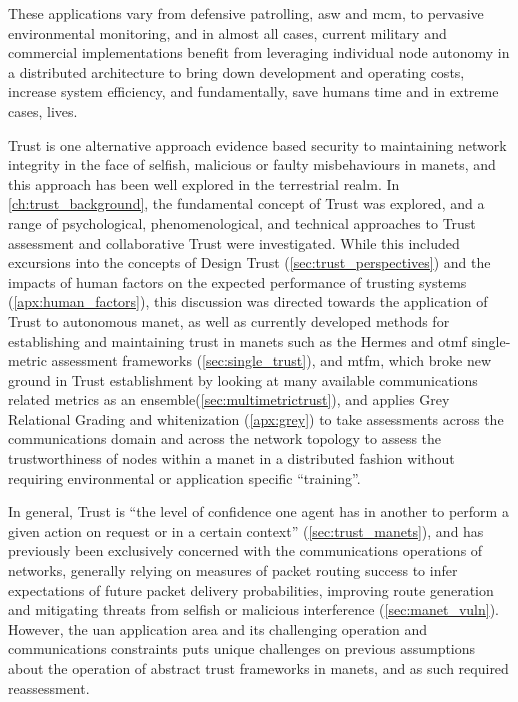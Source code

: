 These applications vary from defensive patrolling, \gls{asw} and \gls{mcm}, to pervasive environmental monitoring, and in almost all cases, current military and commercial implementations benefit from leveraging individual node autonomy in a distributed architecture to bring down development and operating costs, increase system efficiency, and fundamentally, save humans time and in extreme cases, lives. 

Trust is one alternative approach evidence based security to maintaining network integrity in the face of selfish, malicious or faulty misbehaviours in \glspl{manet}, and this approach has been well explored in the terrestrial realm.
In \autoref{ch:trust_background}, the fundamental concept of Trust was explored, and a range of psychological, phenomenological, and technical approaches to Trust assessment and collaborative Trust were investigated.
While this included excursions into the concepts of Design Trust (\autoref{sec:trust_perspectives}) and the impacts of human factors on the expected performance of trusting systems (\autoref{apx:human_factors}), this discussion was directed towards the application of Trust to autonomous \gls{manet}, as well as currently developed methods for establishing and maintaining trust in \glspl{manet} such as the Hermes and \gls{otmf} single-metric assessment frameworks (\autoref{sec:single_trust}), and \gls{mtfm}, which broke new ground in Trust establishment by looking at many available communications related metrics as an ensemble(\autoref{sec:multimetrictrust}), and applies Grey Relational Grading and whitenization (\autoref{apx:grey}) to take assessments across the communications domain and across the network topology to assess the trustworthiness of nodes within a \gls{manet} in a distributed fashion without requiring environmental or application specific ``training''.

In general, Trust is ``the level of confidence one agent has in another to perform a given action on request or in a certain context'' (\autoref{sec:trust_manets}), and has previously been exclusively concerned with the communications operations of networks, generally relying on measures of packet routing success to infer expectations of future packet delivery probabilities, improving route generation and mitigating threats from selfish or malicious interference (\autoref{sec:manet_vuln}).
However, the \gls{uan} application area and its challenging operation and communications constraints puts unique challenges on previous assumptions about the operation of abstract trust frameworks in \glspl{manet}, and as such required reassessment.

